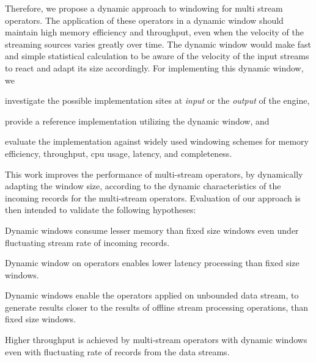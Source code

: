 Therefore, we propose a dynamic approach to windowing for multi stream operators.
The application of these operators in a dynamic window should maintain high memory efficiency and throughput,
even when the velocity of the streaming sources varies greatly over time. 
The dynamic window would make fast and simple statistical calculation to be 
aware of the velocity of the input streams to react and adapt its size accordingly. 
For implementing this dynamic window, we 
\renewcommand{\labelenumi}{(\roman{enumi})}
\begin{enumerate*}
    \item investigate the possible implementation sites at \emph{input}
    or the \emph{output} of the engine, 
    \item provide a reference implementation utilizing the dynamic window, and 
    \item evaluate the implementation against widely used windowing schemes for 
    memory efficiency, throughput, cpu usage, latency, and completeness. 
\end{enumerate*}


This work improves the performance of multi-stream operators, 
by dynamically adapting the window size, according to the dynamic characteristics
of the incoming records for the multi-stream operators. Evaluation of 
our approach is then intended to validate the following hypotheses: 

\begin{hyp}
    Dynamic windows consume lesser memory than 
    fixed size windows even under fluctuating 
    stream rate of incoming records. 
\end{hyp}

\begin{hyp}
    Dynamic window on operators enables lower latency 
    processing than fixed size windows. 
\end{hyp}

\begin{hyp}
    Dynamic windows enable the operators applied on
    unbounded data stream, to generate 
    results closer to the results of offline stream processing operations, 
    than fixed size windows. 
\end{hyp}
\begin{hyp}
    Higher throughput is achieved by multi-stream operators 
    with dynamic windows even with fluctuating
    rate of records from the data streams.
\end{hyp}


